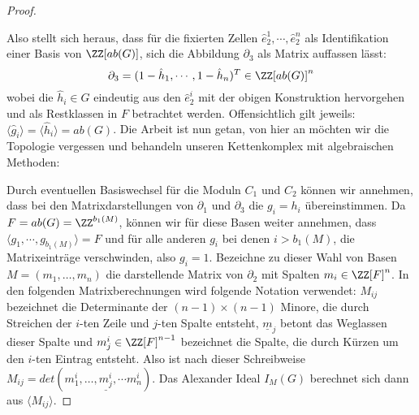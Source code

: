 \begin{proof}
\begin{center}
\end{center}


	Also stellt sich heraus, dass für die fixierten Zellen $\hat e_2^1,\cdots, \hat e_2^n$ als Identifikation einer Basis von $\ZZ[ab(G)]$, sich die Abbildung $\partial_3$ als Matrix auffassen lässt:
	\[
		\partial_3 = (1-\hat h_1,\cdots, 1-\hat h_n)^T \in \ZZ[ab(G)]^n
	\]
	wobei die $\hat h_i \in G$ eindeutig aus den $\hat e_2^i$ mit der obigen Konstruktion hervorgehen und als Restklassen in $F$ betrachtet werden. Offensichtlich gilt jeweils: $\langle \hat g_i \rangle = \langle \hat h_i \rangle = ab(G)$. Die Arbeit ist nun getan, von hier an möchten wir die Topologie vergessen und behandeln unseren Kettenkomplex mit algebraischen Methoden:

	Durch eventuellen Basiswechsel für die Moduln $C_1$ und $C_2$ können wir annehmen, dass bei den Matrixdarstellungen von $\partial_1$ und $\partial_3$ die $g_i=h_i$ übereinstimmen. Da $F=ab(G)=\ZZ^{b_1(M)}$, können wir für diese Basen weiter annehmen, dass $\langle g_1,\cdots,g_{b_1(M)}\rangle=F$ und für alle anderen $g_i$ bei denen $i> b_1(M)$, die Matrixeinträge verschwinden, also $g_i=1$. Bezeichne zu dieser Wahl von Basen $M= (m_1,\dots,m_n)$ die darstellende Matrix von $\partial_2$ mit Spalten $m_i\in \ZZ[F]^n$. In den folgenden Matrixberechnungen wird folgende Notation verwendet: $M_{ij}$ bezeichnet die Determinante der $(n-1)\times (n-1)$ Minore, die durch Streichen der $i$-ten Zeile und $j$-ten Spalte entsteht, $\underline m_j$ betont das Weglassen dieser Spalte und $m_j^i\in \ZZ[F]^{n-1}$ bezeichnet die Spalte, die durch Kürzen um den $i$-ten Eintrag entsteht. Also ist nach dieser Schreibweise $M_{ij}=det(m^i_1, \dots , \underline {m^i_j} , \cdots m^i_n)$. Das Alexander Ideal $I_M(G)$ berechnet sich dann aus $\langle M_{ij} \rangle$.


\end{proof}
